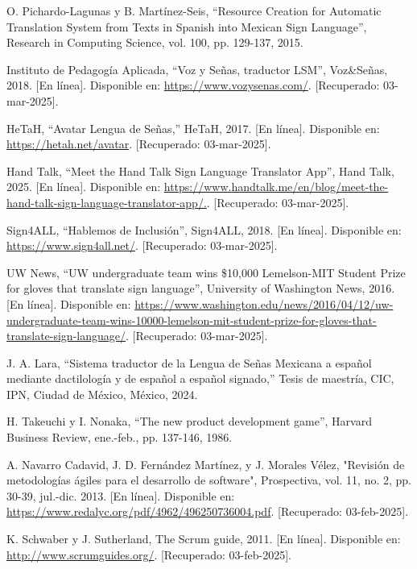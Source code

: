 \begin{thebibliography}{99}
    O. Pichardo-Lagunas y B. Martínez-Seis, “Resource Creation for Automatic Translation System from Texts in Spanish into Mexican Sign Language”, Research in Computing Science, vol. 100, pp. 129-137, 2015.

    Instituto de Pedagogía Aplicada, “Voz y Señas, traductor LSM”, Voz\&Señas, 2018. [En línea]. Disponible en: \url{https://www.vozysenas.com/}. [Recuperado: 03-mar-2025].

    HeTaH, “Avatar Lengua de Señas,” HeTaH, 2017. [En línea]. Disponible en: \url{https://hetah.net/avatar}. [Recuperado: 03-mar-2025].

    Hand Talk, “Meet the Hand Talk Sign Language Translator App”, Hand Talk, 2025. [En línea]. Disponible en: \url{https://www.handtalk.me/en/blog/meet-the-hand-talk-sign-language-translator-app/.}. [Recuperado: 03-mar-2025].

    Sign4ALL, “Hablemos de Inclusión”, Sign4ALL, 2018. [En línea]. Disponible en: \url{https://www.sign4all.net/}. [Recuperado: 03-mar-2025].

    UW News, “UW undergraduate team wins \$10,000 Lemelson-MIT Student Prize for gloves that translate sign language”, University of Washington News, 2016. [En línea]. Disponible en: \url{https://www.washington.edu/news/2016/04/12/uw-undergraduate-team-wins-10000-lemelson-mit-student-prize-for-gloves-that-translate-sign-language/}. [Recuperado: 03-mar-2025].

    J. A. Lara, “Sistema traductor de la Lengua de Señas Mexicana a español mediante dactilología y de español a español signado,” Tesis de maestría, CIC, IPN, Ciudad de México, México, 2024.

    H. Takeuchi y I. Nonaka, “The new product development game”, Harvard Business Review, ene.-feb., pp. 137-146, 1986.

    A. Navarro Cadavid, J. D. Fernández Martínez, y J. Morales Vélez, "Revisión de metodologías ágiles para el desarrollo de software", Prospectiva, vol. 11, no. 2, pp. 30-39, jul.-dic. 2013. [En línea]. Disponible en: \url{https://www.redalyc.org/pdf/4962/496250736004.pdf}. [Recuperado: 03-feb-2025].

    K. Schwaber y J. Sutherland, The Scrum guide, 2011. [En línea]. Disponible en: \url{http://www.scrumguides.org/}. [Recuperado: 03-feb-2025].


\end{thebibliography}
